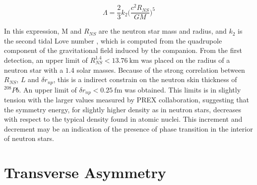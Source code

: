 \begin{equation}
\Lambda = \frac{2}{3} k_{2} \big( \dfrac{c^{2} R_{NS}}{GM} \big)^{5}
\end{equation}

In this expression, M and $R_{NS}$ are the neutron star mass and radius, and $k_{2}$ is the second tidal Love number \cite{Binnington:2009bb}, which is computed from the quadrupole component of the gravitational field induced by the companion. From the first detection, an upper limit of $R_{NS}^{1.4} < \SI{13.76}{\kilo \meter}$ was placed on the radius of a neutron star with a $1.4$ solar masses. Because of the strong correlation between $R_{NS}$, $L$ and $\delta r_{np}$, this is a indirect constrain on the neutron skin thickness of $^{208}Pb$. An upper limit of $\delta r_{np} < \SI{0.25}{\femto \meter}$ was obtained. This limits is in slightly tension with the larger values measured by PREX collaboration, suggesting that the symmetry energy, for slightly higher density as in neutron stars, decreases with respect to the typical density found in atomic nuclei. This increment and decrement may be an indication of the presence of phase transition in the interior of neutron stars.

\section{Transverse Asymmetry}

